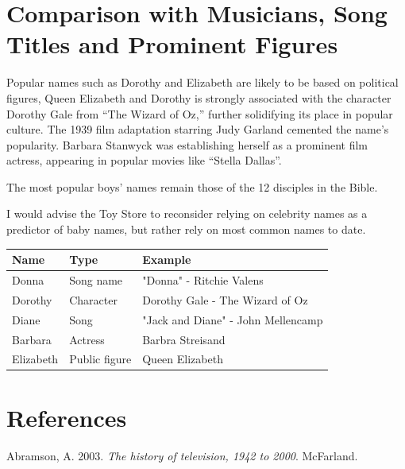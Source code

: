 \documentclass[11pt,preprint]{elsarticle}
\let\origtable\table
\let\endorigtable\endtable
\renewenvironment{table}[1][2] {
    \expandafter\origtable\expandafter[H]
} {
    \endorigtable
}
\numberwithin{equation}{section}
\numberwithin{figure}{section}
\numberwithin{table}{section}
\newlength{\cslhangindent}
\newenvironment{CSLReferences}[2] %
{\begin{list}{}{%
	\setlength{\itemindent}{0pt}
	\setlength{\leftmargin}{0pt}
	\setlength{\parsep}{0pt}
	\ifodd #1
	\setlength{\leftmargin}{\cslhangindent}
	\setlength{\itemindent}{-1\cslhangindent}
	\fi
	\setlength{\itemsep}{#2\baselineskip}}}
{\end{list}}
\begin{document}
\newpage

\section{Comparison with Musicians, Song Titles and Prominent
Figures}\label{comparison-with-musicians-song-titles-and-prominent-figures}

Popular names such as Dorothy and Elizabeth are likely to be based on
political figures, Queen Elizabeth and Dorothy is strongly associated
with the character Dorothy Gale from ``The Wizard of Oz,'' further
solidifying its place in popular culture. The 1939 film adaptation
starring Judy Garland cemented the name's popularity. Barbara Stanwyck
was establishing herself as a prominent film actress, appearing in
popular movies like ``Stella Dallas''.

The most popular boys' names remain those of the 12 disciples in the
Bible.

I would advise the Toy Store to reconsider relying on celebrity names as
a predictor of baby names, but rather rely on most common names to date.

\begin{table}[H]
\centering
\caption{Names in Music, Film and Culture \label{tab:names}} 
\begin{tabular}{lll}
  \hline
Name & Type & Example \\ 
  \hline
Donna & Song name & "Donna" - Ritchie Valens \\ 
  Dorothy & Character & Dorothy Gale - The Wizard of Oz \\ 
  Diane & Song & "Jack and Diane" - John Mellencamp \\ 
  Barbara & Actress & Barbra Streisand \\ 
  Elizabeth & Public figure & Queen Elizabeth \\ 
   \hline
\end{tabular}
\end{table}

\section*{References}\label{references}

\label{refs}
\begin{CSLReferences}{1}{1}
Abramson, A. 2003. \emph{The history of television, 1942 to 2000}.
McFarland.

\end{CSLReferences}


\end{document}
